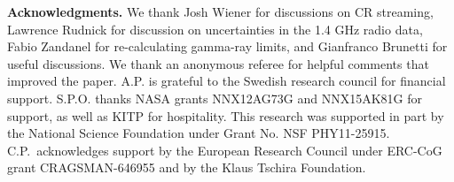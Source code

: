 \documentclass[fleqn,usenatbib,useAMS]{mnras}
\begin{document}
{\bf Acknowledgments.} We thank Josh Wiener for discussions on CR streaming,
Lawrence Rudnick for discussion on uncertainties in the 1.4 GHz radio data,
Fabio Zandanel for re-calculating gamma-ray limits, and Gianfranco Brunetti for
useful discussions. We thank an anonymous referee for helpful comments that
improved the paper. A.P. is grateful to the Swedish research council for
financial support. S.P.O. thanks NASA grants NNX12AG73G and NNX15AK81G for
support, as well as KITP for hospitality. This research was supported in part by
the National Science Foundation under Grant No. NSF
PHY11-25915. C.P.~acknowledges support by the European Research Council under
ERC-CoG grant CRAGSMAN-646955 and by the Klaus Tschira Foundation.


\vspace{-0.7cm}



\end{document}
